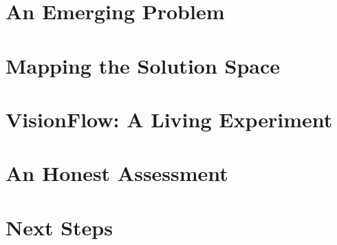 \documentclass[12pt,a4paper,openright]{book}
\begin{document}
\frontmatter
\pagestyle{plain}

\tableofcontents
\listoffigures
\listoftables

\mainmatter
\pagestyle{fancy}



\part{An Emerging Problem}
\label{part:problem}







\part{Mapping the Solution Space}
\label{part:solution-space}












\part{VisionFlow: A Living Experiment}
\label{part:visionflow}









\part{An Honest Assessment}
\label{part:assessment}





\part{Next Steps}
\label{part:next-steps}




\backmatter

\printbibliography[heading=bibintoc, title={References}]

\appendix



\end{document}
